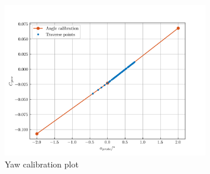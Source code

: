 \documentclass{article}
\begin{document}
\begin{figure}[H]
    \centering
    \includegraphics[width=0.8\textwidth]{figures/yaw_plot.png}
    \caption{Yaw calibration plot}
    \label{fig:yaw_plot}
\end{figure}
\end{document}
